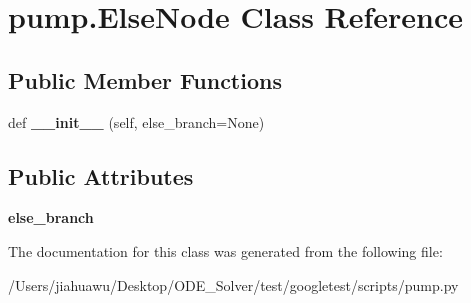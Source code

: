 \hypertarget{classpump_1_1_else_node}{}\section{pump.\+Else\+Node Class Reference}
\label{classpump_1_1_else_node}
\subsection*{Public Member Functions}
\begin{DoxyCompactItemize}
\item 
\mbox{\label{classpump_1_1_else_node_a7489ff8c6c7ddfe6bd6593b8ecccd819}} 
def {\bfseries \+\_\+\+\_\+init\+\_\+\+\_\+} (self, else\+\_\+branch=None)
\end{DoxyCompactItemize}
\subsection*{Public Attributes}
\begin{DoxyCompactItemize}
\item 
\mbox{\label{classpump_1_1_else_node_ac838a0fe9f5d713c7f56939eed5e128d}} 
{\bfseries else\+\_\+branch}
\end{DoxyCompactItemize}


The documentation for this class was generated from the following file\+:\begin{DoxyCompactItemize}
\item 
/\+Users/jiahuawu/\+Desktop/\+O\+D\+E\+\_\+\+Solver/test/googletest/scripts/pump.\+py\end{DoxyCompactItemize}
